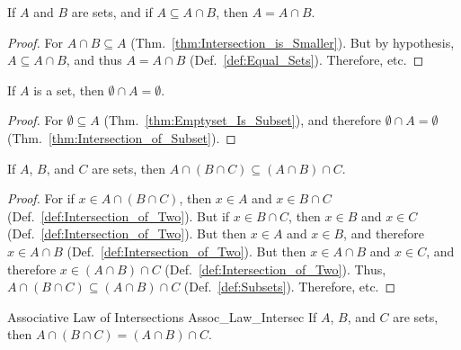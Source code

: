 \documentclass[crop=false,class=book,oneside]{standalone}
\begin{document}
            \begin{theorem}
                \label{thm:Conv_Intersection_is_Smaller}%
                If $A$ and $B$ are sets, and if
                $A\subseteq{A}\cap{B}$, then $A=A\cap{B}$.
            \end{theorem}
            \begin{proof}
                For $A\cap{B}\subseteq{A}$
                (Thm.~\ref{thm:Intersection_is_Smaller}). But
                by hypothesis, $A\subseteq{A}\cap{B}$, and thus
                $A=A\cap{B}$ (Def.~\ref{def:Equal_Sets}).
                Therefore, etc.
            \end{proof}
            \begin{theorem}
                If $A$ is a set, then
                $\emptyset\cap{A}=\emptyset$.
            \end{theorem}
            \begin{proof}
                For $\emptyset\subseteq{A}$
                (Thm.~\ref{thm:Emptyset_Is_Subset}), and
                therefore $\emptyset\cap{A}=\emptyset$
                (Thm.~\ref{thm:Intersection_of_Subset}).
            \end{proof}
            \begin{theorem}
                \label{thm:First_Assoc_Law_Intersec}%
                If $A$, $B$, and $C$ are sets, then
                $A\cap(B\cap{C})\subseteq(A\cap{B})\cap{C}$.
            \end{theorem}
            \begin{proof}
                For if $x\in{A}\cap(B\cap{C})$, then $x\in{A}$
                and $x\in{B}\cap{C}$
                (Def.~\ref{def:Intersection_of_Two}). But if
                $x\in{B}\cap{C}$, then $x\in{B}$ and $x\in{C}$
                (Def.~\ref{def:Intersection_of_Two}). But then
                $x\in{A}$ and $x\in{B}$, and therefore
                $x\in{A}\cap{B}$
                (Def.~\ref{def:Intersection_of_Two}). But
                then $x\in{A}\cap{B}$ and $x\in{C}$, and
                therefore $x\in(A\cap{B})\cap{C}$
                (Def.~\ref{def:Intersection_of_Two}). Thus,
                $A\cap(B\cap{C})\subseteq(A\cap{B})\cap{C}$
                (Def.~\ref{def:Subsets}). Therefore, etc.
            \end{proof}
            \begin{ltheorem}{Associative Law of Intersections}
                  {Assoc_Law_Intersec}
                If $A$, $B$, and $C$ are sets, then
                $A\cap(B\cap{C})=(A\cap{B})\cap{C}$.
            \end{ltheorem}
\end{document}
